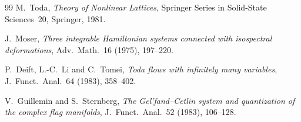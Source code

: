 \documentclass[11pt]{amsart}
\theoremstyle{definition}
\begin{document}
\begin{thebibliography}{99}
  M.~Toda,
  \emph{Theory of Nonlinear Lattices},
  Springer Series in Solid-State Sciences~20, Springer, 1981.

  J.~Moser,
  \emph{Three integrable Hamiltonian systems connected with isospectral
  deformations},
  Adv.\ Math.\ 16 (1975), 197--220.

  P.~Deift, L.-C.~Li and C.~Tomei,
  \emph{Toda flows with infinitely many variables},
  J.\ Funct.\ Anal.\ 64 (1983), 358--402.

  V.~Guillemin and S.~Sternberg,
  \emph{The Gel'fand--Cetlin system and quantization of the complex flag
  manifolds},
  J.\ Funct.\ Anal.\ 52 (1983), 106--128.
\end{thebibliography}
\end{document}
